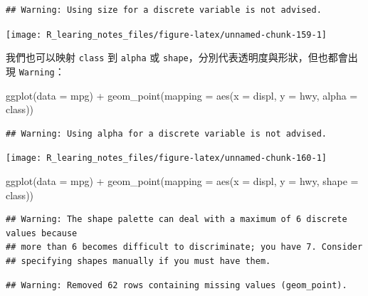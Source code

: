 \documentclass[
]{book}
\newenvironment{Shaded}{\begin{snugshade}}{\end{snugshade}}
\newcommand{\AttributeTok}[1]{\textcolor[rgb]{0.77,0.63,0.00}{#1}}
\newcommand{\FunctionTok}[1]{\textcolor[rgb]{0.00,0.00,0.00}{#1}}
\newcommand{\NormalTok}[1]{#1}
\newcommand{\SpecialCharTok}[1]{\textcolor[rgb]{0.00,0.00,0.00}{#1}}
\theoremstyle{definition}
\theoremstyle{remark}
\begin{document}
\begin{verbatim}
## Warning: Using size for a discrete variable is not advised.
\end{verbatim}

\begin{center}\texttt{[image: R\_learing\_notes\_files/figure-latex/unnamed-chunk-159-1]} \end{center}

我們也可以映射 \texttt{class} 到 \texttt{alpha} 或 \texttt{shape}，分別代表透明度與形狀，但也都會出現 \texttt{Warning}：

\begin{Shaded}
\begin{Highlighting}[]
\FunctionTok{ggplot}\NormalTok{(}\AttributeTok{data =}\NormalTok{ mpg) }\SpecialCharTok{+} \FunctionTok{geom\_point}\NormalTok{(}\AttributeTok{mapping =} \FunctionTok{aes}\NormalTok{(}\AttributeTok{x =}\NormalTok{ displ, }\AttributeTok{y =}\NormalTok{ hwy, }\AttributeTok{alpha =}\NormalTok{ class))}
\end{Highlighting}
\end{Shaded}

\begin{verbatim}
## Warning: Using alpha for a discrete variable is not advised.
\end{verbatim}

\begin{center}\texttt{[image: R\_learing\_notes\_files/figure-latex/unnamed-chunk-160-1]} \end{center}

\begin{Shaded}
\begin{Highlighting}[]
\FunctionTok{ggplot}\NormalTok{(}\AttributeTok{data =}\NormalTok{ mpg) }\SpecialCharTok{+} \FunctionTok{geom\_point}\NormalTok{(}\AttributeTok{mapping =} \FunctionTok{aes}\NormalTok{(}\AttributeTok{x =}\NormalTok{ displ, }\AttributeTok{y =}\NormalTok{ hwy, }\AttributeTok{shape =}\NormalTok{ class))}
\end{Highlighting}
\end{Shaded}

\begin{verbatim}
## Warning: The shape palette can deal with a maximum of 6 discrete values because
## more than 6 becomes difficult to discriminate; you have 7. Consider
## specifying shapes manually if you must have them.
\end{verbatim}

\begin{verbatim}
## Warning: Removed 62 rows containing missing values (geom_point).
\end{verbatim}
\end{document}
